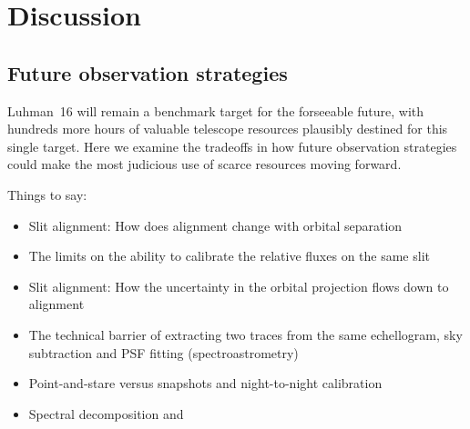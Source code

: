 \documentclass[modern]{aastex631}
\begin{document}
\section{Discussion}

\subsection{Future observation strategies}
Luhman~16 will remain a benchmark target for the forseeable future, with hundreds more hours of valuable telescope resources plausibly destined for this single target.  Here we examine the tradeoffs in how future observation strategies could make the most judicious use of scarce resources moving forward.

Things to say:  
\begin{itemize}
  \item Slit alignment: How does alignment change with orbital separation
  \item The limits on the ability to calibrate the relative fluxes on the same slit
  \item Slit alignment: How the uncertainty in the orbital projection flows down to alignment
  \item The technical barrier of extracting two traces from the same echellogram, sky subtraction and PSF fitting (spectroastrometry)
  \item Point-and-stare versus snapshots and night-to-night calibration
  \item Spectral decomposition and 
\end{itemize}
\end{document}
